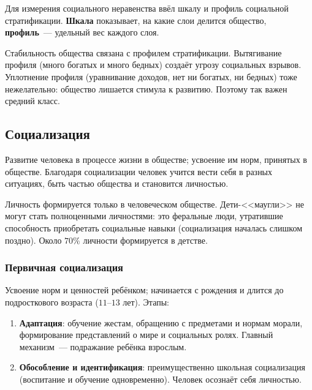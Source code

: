 \documentclass[12pt]{article}
\begin{document}
	\begin{person}
		Для измерения социального неравенства ввёл шкалу и профиль социальной стратификации. \textbf{Шкала} показывает, на какие слои делится общество, \textbf{профиль}~--- удельный вес каждого слоя.

		Стабильность общества связана с профилем стратификации. Вытягивание профиля (много богатых и много бедных) создаёт угрозу социальных взрывов. Уплотнение профиля (уравнивание доходов, нет ни богатых, ни бедных) тоже нежелательно: общество лишается стимула к развитию. Поэтому так важен средний класс.
	\end{person}

	\subsection{Социализация}

	\begin{definition}[Социализация]
		Развитие человека в процессе жизни в обществе; усвоение им норм, принятых в обществе. Благодаря социализации человек учится вести себя в разных ситуациях, быть частью общества и становится личностью.
	\end{definition}

	\begin{note}
		Личность формируется только в человеческом обществе. Дети-<<маугли>> не могут стать полноценными личностями: это феральные люди, утратившие способность приобретать социальные навыки (социализация началась слишком поздно). Около $70\%$ личности формируется в детстве.
	\end{note}

	\subsubsection{Первичная социализация}

	Усвоение норм и ценностей ребёнком; начинается с рождения и длится до подросткового возраста ($11$--$13$ лет). Этапы:
	\begin{enumerate}
		\item \textbf{Адаптация}: обучение жестам, обращению с предметами и нормам морали, формирование представлений о мире и социальных ролях. Главный механизм~--- подражание ребёнка взрослым.
		\item \textbf{Обособление и идентификация}: преимущественно школьная социализация (воспитание и обучение одновременно). Человек осознаёт себя личностью.
	\end{enumerate}
\end{document}
